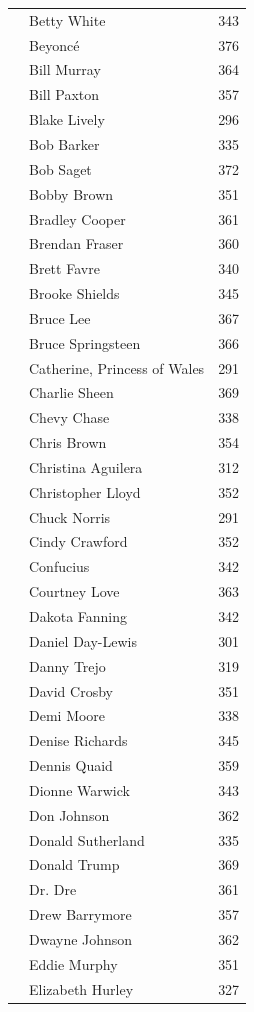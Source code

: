 \documentclass{article}
\begin{document}
{\begin{longtable}{p{}p{}r}
 & Betty White & 343 \\
 & Beyonc\'e & 376 \\
 & Bill Murray & 364 \\
 & Bill Paxton & 357 \\
 & Blake Lively & 296 \\
 & Bob Barker & 335 \\
 & Bob Saget & 372 \\
 & Bobby Brown & 351 \\
 & Bradley Cooper & 361 \\
 & Brendan Fraser & 360 \\
 & Brett Favre & 340 \\
 & Brooke Shields & 345 \\
 & Bruce Lee & 367 \\
 & Bruce Springsteen & 366 \\
 & Catherine, Princess of Wales & 291 \\
 & Charlie Sheen & 369 \\
 & Chevy Chase & 338 \\
 & Chris Brown & 354 \\
 & Christina Aguilera & 312 \\
 & Christopher Lloyd & 352 \\
 & Chuck Norris & 291 \\
 & Cindy Crawford & 352 \\
 & Confucius & 342 \\
 & Courtney Love & 363 \\
 & Dakota Fanning & 342 \\
 & Daniel Day-Lewis & 301 \\
 & Danny Trejo & 319 \\
 & David Crosby & 351 \\
 & Demi Moore & 338 \\
 & Denise Richards & 345 \\
 & Dennis Quaid & 359 \\
 & Dionne Warwick & 343 \\
 & Don Johnson & 362 \\
 & Donald Sutherland & 335 \\
 & Donald Trump & 369 \\
 & Dr. Dre & 361 \\
 & Drew Barrymore & 357 \\
 & Dwayne Johnson & 362 \\
 & Eddie Murphy & 351 \\
 & Elizabeth Hurley & 327 \\

\end{longtable}}
\end{document}
